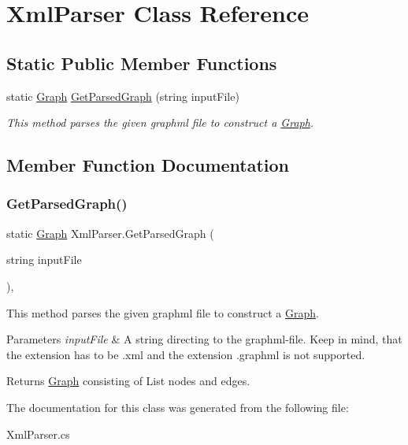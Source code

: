 \hypertarget{class_xml_parser}{}\section{Xml\+Parser Class Reference}
\label{class_xml_parser}
\subsection*{Static Public Member Functions}
\begin{DoxyCompactItemize}
\item 
static \mbox{\hyperlink{class_graph}{Graph}} \mbox{\hyperlink{class_xml_parser_ae8f169d407e7e3fbe866fdff38dc47c1}{Get\+Parsed\+Graph}} (string input\+File)
\begin{DoxyCompactList}\small\item\em This method parses the given graphml file to construct a \mbox{\hyperlink{class_graph}{Graph}}. \end{DoxyCompactList}\end{DoxyCompactItemize}


\subsection{Member Function Documentation}
\mbox{\label{class_xml_parser_ae8f169d407e7e3fbe866fdff38dc47c1}} 
\subsubsection{\texorpdfstring{GetParsedGraph()}{GetParsedGraph()}}
{\footnotesize\ttfamily static \mbox{\hyperlink{class_graph}{Graph}} Xml\+Parser.\+Get\+Parsed\+Graph (\begin{DoxyParamCaption}\item[{string}]{input\+File }\end{DoxyParamCaption})\hspace{0.3cm}{\ttfamily [inline]}, {\ttfamily [static]}}



This method parses the given graphml file to construct a \mbox{\hyperlink{class_graph}{Graph}}. 


\begin{DoxyParams}{Parameters}
{\em input\+File} & A string directing to the graphml-\/file. Keep in mind, that the extension has to be .xml and the extension .graphml is not supported.\\
\hline
\end{DoxyParams}
\begin{DoxyReturn}{Returns}
\mbox{\hyperlink{class_graph}{Graph}} consisting of List nodes and edges.
\end{DoxyReturn}


The documentation for this class was generated from the following file\+:\begin{DoxyCompactItemize}
\item 
Xml\+Parser.\+cs\end{DoxyCompactItemize}
